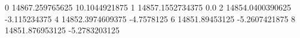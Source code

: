 0 14867.259765625 10.1044921875
1 14857.1552734375 0.0
2 14854.0400390625 -3.115234375
4 14852.3974609375 -4.7578125
6 14851.89453125 -5.2607421875
8 14851.876953125 -5.2783203125
